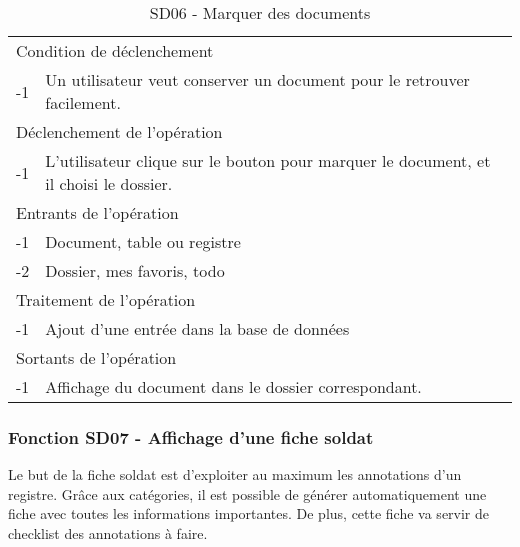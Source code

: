 \documentclass[a4paper]{article}
\begin{document}
\begin{table}[H]
  \centering
   \small
	\begin{tabular}{|c|p{12cm}|}
   		\hline
   			\rowcolor{lightgray}\multicolumn{2}{|c|}{\textbf{SD06 - Marquer des documents}} \\
   		\hline
   			\multicolumn{2}{|l|}{Condition de d\'eclenchement} \\
   		\hline
   		-1 & Un utilisateur veut conserver un document pour le retrouver facilement. \\
   		\hline
   			\multicolumn{2}{|l|}{D\'eclenchement de l'op\'eration} \\
   		\hline
   			-1 & L'utilisateur clique sur le bouton pour marquer le document, et il choisi le dossier. \\
   		\hline
   			\multicolumn{2}{|l|}{Entrants de l'op\'eration} \\
   		\hline
   			-1 & Document, table ou registre\\
        	-2 & Dossier, mes favoris, todo \\
   		\hline
   			\multicolumn{2}{|l|}{Traitement de l'op\'eration} \\
  		\hline
   			-1 & Ajout d'une entr\'ee dans la base de donn\'ees \\
   		\hline
   			\multicolumn{2}{|l|}{Sortants de l'op\'eration} \\
   		\hline
   			-1 & Affichage du document dans le dossier correspondant. \\
   		\hline
	\end{tabular}
  \caption{SD06 - Marquer des documents}
  \normalsize
  \label{tab:marquer_documents}
\end{table}


\subsubsection{Fonction SD07 - Affichage d'une fiche soldat}

Le but de la fiche soldat est d'exploiter au maximum les annotations d'un registre. Gr\^ace aux cat\'egories, il est possible de g\'en\'erer automatiquement une fiche avec toutes les informations importantes. De plus, cette fiche va servir de checklist des annotations \`a faire.\\
\end{document}
